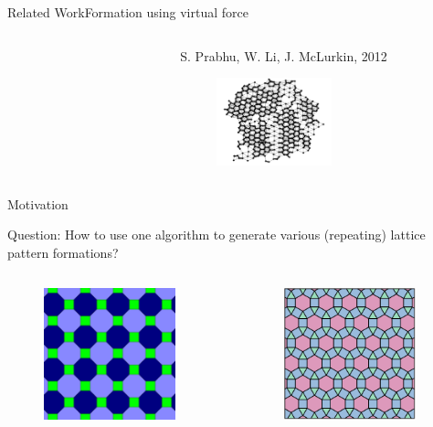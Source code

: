 \documentclass[10pt]{beamer}
\begin{document}
\begin{frame}{Related Work}{Formation using virtual force}
\begin{columns}[T]
\begin{column}{.45\textwidth}
\begin{figure}
      \end{figure}  
    \end{column}%
    \begin{column}{.45\textwidth}
      \scriptsize{S. Prabhu, W. Li, J. McLurkin, 2012}
      \begin{figure}
        \centering
        \includegraphics[height=1in]{figs/james.png}
      \end{figure}
    \end{column}
  \end{columns}
\end{frame}

\begin{frame}{Motivation}{}
  \begin{block}{Question: How to use one algorithm to generate
      various (repeating) lattice pattern formations?}
    \begin{columns}
    \begin{column}{.45\textwidth}
      \begin{figure}
        \centering
        \includegraphics[height=1.5in]{figs/tessellation2.png}
      \end{figure}
    \end{column}
    \begin{column}{.45\textwidth}
       \begin{figure}
         \centering
        \includegraphics[height=1.5in]{figs/tessellation1.png}
      \end{figure}
    \end{column}
  \end{columns} 
  \end{block}
\end{frame}
\end{document}
